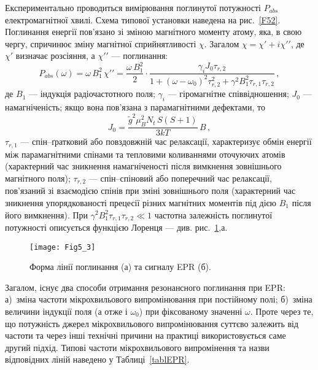 Експериментально проводиться вимірювання поглинутої потужності $P_{abs}$
електромагнітної хвилі.
Схема типової установки наведена на рис.~\ref{F52}.
Поглинання енергії пов'язано зі зміною магнітного моменту атому,
яка, в свою чергу, спричинює зміну магнітної сприйнятливості $\chi$.
Загалом $\chi=\chi\prime+i\chi\prime\prime$,
де $\chi\prime$ визначає розсіяння, а $\chi\prime\prime$ --- поглинання:
\begin{equation}\label{EPRP}
P_{abs}(\omega)=\omega\,B_1^2\,\chi\prime\prime=\frac{\omega\,B_1^2}{2}\cdot\frac{\gamma_{i} J_0 \tau_{r,2}}
 {1+(\omega-\omega_0)^2\tau_{r,2}^2+\gamma^2B_1^2\tau_{r,1}\tau_{r,2}}\,,
\end{equation}
де
$B_1$ --- індукція радіочастотного поля;
$\gamma_{i}$ --- гіромагнітне співвідношення;
$J_0$ --- намагніченість; якщо вона пов'язана з парамагнітними дефектами, то
\begin{equation}\label{EPRJ0}
J_0=\frac{\tilde{g}^2\mu_B^2N_t\,S(S+1)}{3kT}\,B\,,
\end{equation}
$\tau_{r,1}$ --- спін--ґратковий або повздовжній час релаксації,
характеризує обмін енергії між парамагнітними спінами та тепловими
коливаннями оточуючих атомів (характерний час зникнення намагніченості
після вимкнення зовнішнього магнітного поля);
$\tau_{r,2}$ --- спін--спіновий або поперечний час релаксації,
пов'язаний зі взаємодією спінів при зміні зовнішнього поля
(характерний час зникнення упорядкованості прецесії різних магнітних моментів
під дією $B_1$ після його вимкнення).
При $\gamma^2B_1^2\tau_{r,1}\tau_{r,2}\ll 1$ частотна залежність поглинутої
потужності описується функцією Лоренця --- див. рис.~\ref{F53},а.


\begin{figure}[!t]
\center
\vspace{-5mm}
\texttt{[image: Fig5\_3]}
\vspace{-3mm}
\caption{Форма лінії поглинання (а) та сигналу EPR (б).
}
\vspace{-3mm}
\label{F53}
\end{figure}

Загалом, існує два способи отримання резонансного поглинання при EPR:
а)~зміна частоти мікрохвильового випромінювання при постійному полі;
б)~зміна величини індукції поля (а отже і $\omega_0$) при фіксованому значенні $\omega$.
Проте через те, що потужність джерел мікрохвильового випромінювання суттєво залежить
від частоти та через інші технічні причини на практиці використовується саме другий підхід.
Типові частоти мікрохвильового випромінення та назви відповідних ліній наведено у Таблиці~\ref{tablEPR}.


